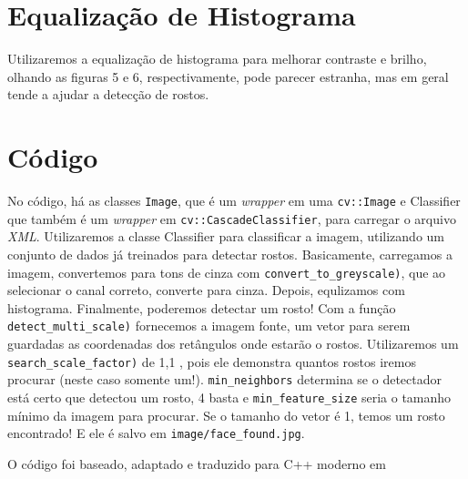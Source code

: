 \documentclass[12pt]{article}
\def\code#1{\texttt{#1}}
\begin{document}
	\section{Equalização de Histograma}
	
	Utilizaremos a equalização de histograma para melhorar contraste e brilho, olhando as figuras 5 e 6, respectivamente, pode parecer estranha, mas em geral tende a ajudar a detecção de rostos.
	
	\section{Código}
	No código, há as classes 
	\code{Image}, que é um \textit{wrapper} em uma \code{cv::Image} e Classifier que também é um \textit{wrapper} em \code{cv::CascadeClassifier}, para carregar o arquivo \textit{XML}. Utilizaremos a classe Classifier para classificar a imagem, utilizando um conjunto de dados já treinados para detectar rostos.
	Basicamente, carregamos a imagem, convertemos para tons de cinza com \code{convert\_to\_greyscale)}, que ao selecionar o canal correto, converte para cinza. Depois, equlizamos com histograma.
	Finalmente, poderemos detectar um rosto! Com a função \code{detect\_multi\_scale)} fornecemos a imagem fonte, um vetor para serem guardadas as coordenadas dos retângulos onde estarão o rostos. Utilizaremos um \code{search\_scale\_factor)} de 1,1 , pois ele demonstra quantos rostos iremos procurar (neste caso somente um!). \code{min\_neighbors}
	determina se o detectador está certo que detectou um rosto, 4 basta e \code{min\_feature\_size} seria o tamanho mínimo da imagem para procurar. 
	Se o tamanho do vetor é 1, temos um rosto encontrado!
	E ele é salvo em \code{image/face\_found.jpg}.
	
	
	
	
	
		
	
	O código foi baseado, adaptado e traduzido para C++ moderno em \textcite{opencvbook}
	\printbibliography
\end{document}
